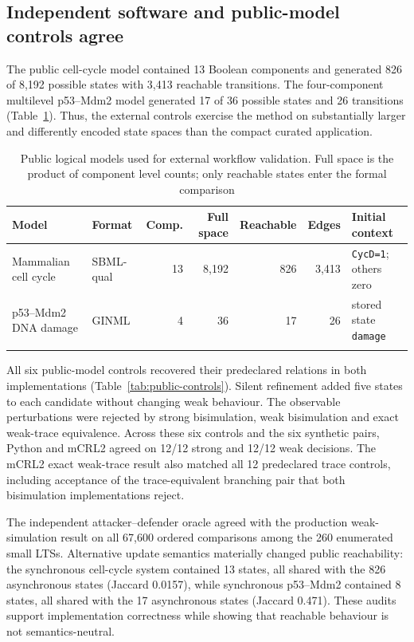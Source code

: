 \documentclass[pdflatex,sn-mathphys-ay]{sn-jnl}
\theoremstyle{definition}
\begin{document}
\subsection{Independent software and public-model controls agree}
\label{sec:external-results}

The public cell-cycle model contained 13 Boolean components and generated 826 of
8,192 possible states with 3,413 reachable transitions. The four-component
multilevel p53--Mdm2 model generated 17 of 36 possible states and 26 transitions
(Table~\ref{tab:public-models}). Thus, the external controls exercise the method
on substantially larger and differently encoded state spaces than the compact
curated application.

\begin{table}[t]
\caption{Public logical models used for external workflow validation. Full space
is the product of component level counts; only reachable states enter the formal
comparison}\label{tab:public-models}
\centering
\scriptsize
\setlength{\tabcolsep}{2pt}
\begin{tabularx}{\textwidth}{@{}>{\raggedright\arraybackslash}p{2.25cm}lrrrr>{\raggedright\arraybackslash}X@{}}
\toprule
Model & Format & Comp. & Full space & Reachable & Edges & Initial context \\
\midrule
Mammalian cell cycle & SBML-qual & 13 & 8,192 & 826 & 3,413 & \texttt{CycD=1}; others zero \\
p53--Mdm2 DNA damage & GINML & 4 & 36 & 17 & 26 & stored state \texttt{damage} \\
\botrule
\end{tabularx}
\end{table}

All six public-model controls recovered their predeclared relations in both
implementations (Table~\ref{tab:public-controls}). Silent refinement added five
states to each candidate without changing weak behaviour. The observable
perturbations were rejected by strong bisimulation, weak bisimulation and exact
weak-trace equivalence. Across these six controls and the six synthetic pairs,
Python and mCRL2 agreed on 12/12 strong and 12/12 weak decisions. The mCRL2 exact
weak-trace result also matched all 12 predeclared trace controls, including
acceptance of the trace-equivalent branching pair that both bisimulation
implementations reject.

The independent attacker--defender oracle agreed with the production weak-
simulation result on all 67,600 ordered comparisons among the 260 enumerated
small LTSs. Alternative update semantics materially changed public reachability:
the synchronous cell-cycle system contained 13 states, all shared with the 826
asynchronous states (Jaccard 0.0157), while synchronous p53--Mdm2 contained 8
states, all shared with the 17 asynchronous states (Jaccard 0.471). These audits
support implementation correctness while showing that reachable behaviour is
not semantics-neutral.
\end{document}
